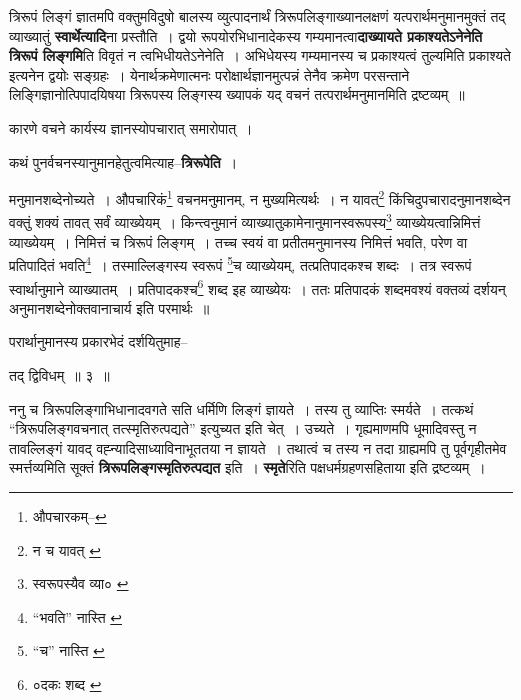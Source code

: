 \documentclass[article,12pt,a4paper]{memoir}
\begin{document}
	  \endgroup
	

	  \pstart त्रिरूपं लिङ्गं ज्ञातमपि वक्तुमविदुषो बालस्य व्युत्पादनार्थं त्रिरूपलिङ्गाख्यानलक्षणं यत्परार्थमनुमानमुक्तं तद् व्याख्यातुं \textbf{स्वार्थेत्यादि}ना प्रस्तौति । द्वयो रूपयोरभिधानादेकस्य गम्यमानत्वा\textbf{दाख्यायते प्रकाश्यतेऽनेनेति त्रिरूपं लिङ्गमि}ति विवृतं न त्वभिधीयतेऽनेनेति । अभिधेयस्य गम्यमानस्य च प्रकाश्यत्वं तुल्यमिति प्रकाश्यते इत्यनेन द्वयोः सङ्ग्रहः । येनार्थक्रमेणात्मनः परोक्षार्थज्ञानमुत्पन्नं तेनैव क्रमेण परसन्ताने लिङ्गिज्ञानोत्पिपादयिषया त्रिरूपस्य लिङ्गस्य ख्यापकं यद् वचनं तत्परार्थमनुमानमिति द्रष्टव्यम् ॥
	\pend
      

	  \pstart कारणे वचने कार्यस्य ज्ञानस्योपचारात् समारोपात् ।
	\pend
      

	  \pstart कथं पुनर्वचनस्यानुमानहेतुत्वमित्याह--\textbf{त्रिरूपेति} ।
	\pend
      \leavevmode{}
	  \bigskip
	  \begingroup
	

	  \pstart मनुमानशब्देनोच्यते । औपचारिकं\footnote{औपचारकम्--\cite{dp-msA}} वचनमनुमानम्, न मुख्यमित्यर्थः । न यावत्\footnote{न च यावत् \cite{dp-msA} \cite{dp-msB} \cite{dp-msD} \cite{dp-edP} \cite{dp-edH} \cite{dp-edE} \cite{dp-edN}} किंचिदुपचारादनुमानशब्देन वक्तुं शक्यं तावत् सर्वं व्याख्येयम् । किन्त्वनुमानं व्याख्यातुकामेनानुमानस्वरूपस्य\footnote{स्वरूपस्यैव व्या० \cite{dp-msC}} व्याख्येयत्वान्निमित्तं व्याख्येयम् । निमित्तं च त्रिरूपं लिङ्गम् । तच्च स्वयं वा प्रतीतमनुमानस्य निमित्तं भवति, परेण वा प्रतिपादितं भवति\footnote{“भवति” नास्ति \cite{dp-msA} \cite{dp-msC} \cite{dp-edP} \cite{dp-edE} \cite{dp-edN}} । तस्माल्लिङ्गस्य स्वरूपं \footnote{“च” नास्ति \cite{dp-msA} \cite{dp-edP} \cite{dp-edH} \cite{dp-edE} \cite{dp-edN}}च व्याख्येयम्, तत्प्रतिपादकश्च शब्दः । तत्र स्वरूपं स्वार्थानुमाने व्याख्यातम् । प्रतिपादकश्च\footnote{०दकः शब्द \cite{dp-msA} \cite{dp-msB} \cite{dp-edP} \cite{dp-edH} \cite{dp-edE} \cite{dp-edN}} शब्द इह व्याख्येयः । ततः प्रतिपादकं शब्दमवश्यं वक्तव्यं दर्शयन् अनुमानशब्देनोक्तवानाचार्य इति परमार्थः ॥
	\pend
       

	  \pstart परार्थानुमानस्य प्रकारभेदं दर्शयितुमाह--
	\pend
      
	  \endgroup
	
	  \bigskip
	  \begingroup
	

	  \pstart तद् द्विविधम् ॥ ३ ॥
	\pend
      
	  \endgroup
	

	  \pstart ननु च त्रिरूपलिङ्गाभिधानादवगते सति धर्मिणि लिङ्गं ज्ञायते । तस्य तु व्याप्तिः स्मर्यते । तत्कथं “त्रिरूपलिङ्गवचनात् तत्स्मृतिरुत्पद्यते” इत्युच्यत इति चेत् । उच्यते । गृह्यमाणमपि धूमादिवस्तु न तावल्लिङ्गं यावद् वह्न्यादिसाध्याविनाभूततया न ज्ञायते । तथात्वं च तस्य न तदा ग्राह्यमपि तु पूर्वगृहीतमेव स्मर्त्तव्यमिति सूक्तं \textbf{त्रिरूपलिङ्गस्मृतिरुत्पद्यत} इति । \textbf{स्मृते}रिति पक्षधर्मग्रहणसहिताया इति द्रष्टव्यम् ।
	\pend
      
\end{document}
